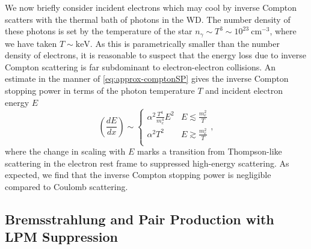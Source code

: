 \documentclass[twocolumn, preprintnumbers,amsmath,amssymb,prd, superscriptaddress]{revtex4}
\newcommand{\cm}{\text{cm}}
\def\r{\right)}
\def\l{\left(}
\begin{document}
\begin{appendices}
We now briefly consider incident electrons which may cool by inverse Compton scatters with the thermal bath of photons in the WD.
The number density of these photons is set by the temperature of the star $n_\gamma \sim T^3 \sim 10^{23} ~\cm^{-3}$, where we have taken $T \sim \text{keV}$.
As this is parametrically smaller than the number density of electrons, it is reasonable to suspect that the energy loss due to inverse Compton scattering is far subdominant to electron-electron collisions.
An estimate in the manner of \eqref{eq:approx-comptonSP} gives the inverse Compton stopping power in terms of the photon temperature $T$ and incident electron energy $E$
\begin{equation}
\label{eq:invcomptonSP}
  \l \frac{dE}{dx}\r \sim
  \begin{cases}
    \alpha^2 \frac{T^4}{m_e^4} E^2 & E \lesssim \frac{m_e^2}{T} \\
    \alpha^2 T^2 & E \gtrsim \frac{m_e^2}{T} \\
  \end{cases},
\end{equation}
where the change in scaling with $E$ marks a transition from Thompson-like scattering in the electron rest frame to suppressed high-energy scattering.
As expected, we find that the inverse Compton stopping power is negligible compared to Coulomb scattering.

\subsection{Bremsstrahlung and Pair Production with LPM Suppression}
\label{sec:emshowers}


\end{appendices}
\end{document}
